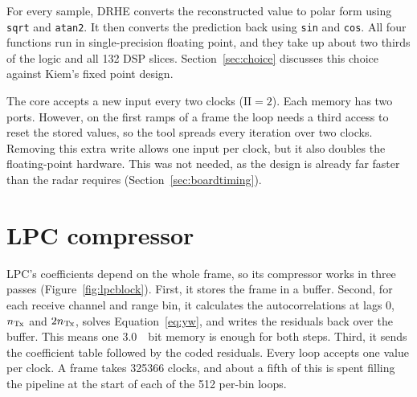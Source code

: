 For every sample, DRHE converts the reconstructed value to polar form using
\texttt{sqrt} and \texttt{atan2}. It then converts the prediction back using
\texttt{sin} and \texttt{cos}. All four functions run in single-precision
floating point, and they take up about two thirds of the logic and all 132 DSP
slices. Section~\ref{sec:choice} discusses this choice against Kiem's fixed
point design.

The core accepts a new input every two clocks ($\mathrm{II} = 2$). Each memory
has two ports. However, on the first ramps of a frame the loop needs a third
access to reset the stored values, so the tool spreads every iteration over two
clocks. Removing this extra write allows one input per clock, but it also
doubles the floating-point hardware. This was not needed, as the design is
already far faster than the radar requires (Section~\ref{sec:boardtiming}).

\section{LPC compressor}
\label{sec:lpcimpl}

LPC's coefficients depend on the whole frame, so its compressor works in three
passes (Figure~\ref{fig:lpcblock}). First, it stores the frame in a buffer.
Second, for each receive channel and range bin, it calculates the
autocorrelations at lags $0$, $n_{\mathrm{Tx}}$ and $2n_{\mathrm{Tx}}$, solves
Equation~\eqref{eq:yw}, and writes the residuals back over the buffer. This
means one \SI{3.0}{\mebi bit} memory is enough for both steps. Third, it sends
the coefficient table followed by the coded residuals. Every loop accepts one
value per clock. A frame takes \num{325366} clocks, and about a fifth of this
is spent filling the pipeline at the start of each of the 512 per-bin loops.

